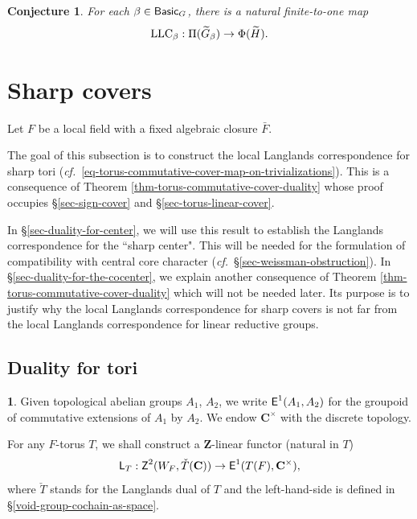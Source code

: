 \documentclass[10pt,english,reqno]{amsart}
\newcommand{\integers}{\mathbf Z}
\newcommand{\complexes}{\mathbf C}
\newcommand{\Basic}{\textnormal{\textsf{Basic}}}
\newcommand{\cycle}{\textnormal{\textsf{Z}}}
\newcommand{\extension}{\textnormal{\textsf{E}}}
\newcommand{\LLC}{\textnormal{LLC}}
\newcommand{\Langlands}{\textnormal{\textsf{L}}}
\newtheorem{conj}[subsubsection]{Conjecture}
\theoremstyle{definition}
\numberwithin{equation}{section}
\newtheorem{untitledsubsubsection}[subsubsection]{}
\newenvironment{void}
{\begin{untitledsubsubsection}}
{\end{untitledsubsubsection}}
\begin{document}

\begin{conj}
\label{conj-enhanced-local-langlands-correspondence}
For each $\beta \in \Basic_G$, there is a natural finite-to-one map
\begin{equation}
\label{eq-local-langlands-correspondence-isocrystal}
\LLC_{\beta} : \Pi(\widetilde G_{\beta}) \rightarrow \Phi(\widetilde H).
\end{equation}
\end{conj}



\medskip



\section{Sharp covers}
\label{sec-sharp-covers}

Let $F$ be a local field with a fixed algebraic closure $\bar F$.

The goal of this subsection is to construct the local Langlands correspondence for sharp tori (\emph{cf.}~\eqref{eq-torus-commutative-cover-map-on-trivializations}). This is a consequence of Theorem \ref{thm-torus-commutative-cover-duality} whose proof occupies \S\ref{sec-sign-cover} and \S\ref{sec-torus-linear-cover}.

In \S\ref{sec-duality-for-center}, we will use this result to establish the Langlands correspondence for the ``sharp center". This will be needed for the formulation of compatibility with central core character (\emph{cf.}~\S\ref{sec-weissman-obstruction}). In \S\ref{sec-duality-for-the-cocenter}, we explain another consequence of Theorem \ref{thm-torus-commutative-cover-duality} which will not be needed later. Its purpose is to justify why the local Langlands correspondence for sharp covers is not far from the local Langlands correspondence for linear reductive groups.

\subsection{Duality for tori}
\label{sec-sharp-tori-duality}

\begin{void}
\label{void-class-field-theory-functor}
Given topological abelian groups $A_1$, $A_2$, we write $\extension^1(A_1, A_2)$ for the groupoid of commutative extensions of $A_1$ by $A_2$. We endow $\complexes^{\times}$ with the discrete topology.

For any $F$-torus $T$, we shall construct a $\integers$-linear functor (natural in $T$)
\begin{equation}
\label{eq-class-field-theory-functor}
\Langlands_T : \cycle^2(W_F, \check T(\complexes)) \rightarrow \extension^1(T(F), \complexes^{\times}),
\end{equation}
where $\check T$ stands for the Langlands dual of $T$ and the left-hand-side is defined in \S\ref{void-group-cochain-as-space}.
\end{void}
\end{document}
